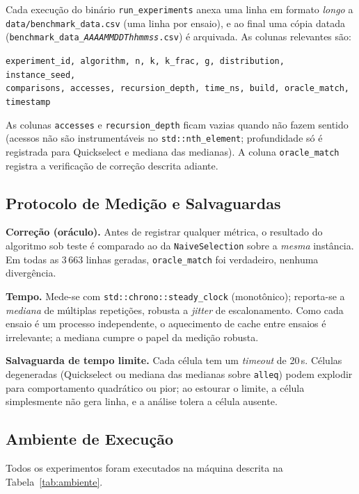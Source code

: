 \documentclass{infufrgs}
\begin{document}
Cada execução do binário \texttt{run\_experiments} anexa uma linha em formato \emph{longo} a \texttt{data/benchmark\_data.csv} (uma linha por ensaio), e ao final uma cópia datada (\texttt{benchmark\_data\_\textit{AAAAMMDDThhmmss}.csv}) é arquivada. As colunas relevantes são:

\begin{center}
\texttt{experiment\_id, algorithm, n, k, k\_frac, g, distribution, instance\_seed,}\\
\texttt{comparisons, accesses, recursion\_depth, time\_ns, build, oracle\_match, timestamp}
\end{center}

As colunas \texttt{accesses} e \texttt{recursion\_depth} ficam vazias quando não fazem sentido (acessos não são instrumentáveis no \texttt{std::nth\_element}; profundidade só é registrada para Quickselect e mediana das medianas). A coluna \texttt{oracle\_match} registra a verificação de correção descrita adiante.

\subsection{Protocolo de Medição e Salvaguardas}

\textbf{Correção (oráculo).} Antes de registrar qualquer métrica, o resultado do algoritmo sob teste é comparado ao da \texttt{NaiveSelection} sobre a \emph{mesma} instância. Em todas as 3\,663 linhas geradas, \texttt{oracle\_match} foi verdadeiro, nenhuma divergência.

\textbf{Tempo.} Mede-se com \texttt{std::chrono::steady\_clock} (monotônico); reporta-se a \emph{mediana} de múltiplas repetições, robusta a \emph{jitter} de escalonamento. Como cada ensaio é um processo independente, o aquecimento de cache entre ensaios é irrelevante; a mediana cumpre o papel da medição robusta.

\textbf{Salvaguarda de tempo limite.} Cada célula tem um \emph{timeout} de 20\,s. Células degeneradas (Quickselect ou mediana das medianas sobre \texttt{alleq}) podem explodir para comportamento quadrático ou pior; ao estourar o limite, a célula simplesmente não gera linha, e a análise tolera a célula ausente.

\subsection{Ambiente de Execução}

Todos os experimentos foram executados na máquina descrita na Tabela~\ref{tab:ambiente}.
\end{document}
